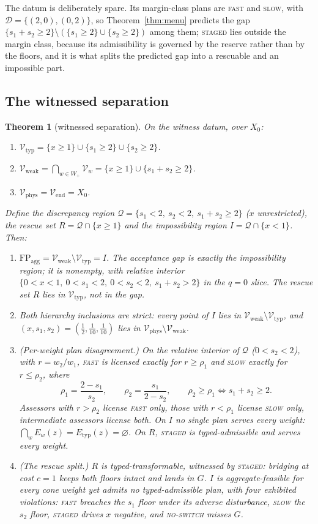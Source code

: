 \documentclass[preprint,11pt,authoryear]{elsarticle}
\newtheorem{theorem}{Theorem}
\theoremstyle{definition}
\theoremstyle{remark}
\newcommand{\Etyp}{E_{\mathrm{typ}}}
\newcommand{\Vtyp}{\mathcal{V}_{\mathrm{typ}}}
\newcommand{\Vweak}{\mathcal{V}_{\mathrm{weak}}}
\newcommand{\Vphys}{\mathcal{V}_{\mathrm{phys}}}
\newcommand{\Vend}{\mathcal{V}_{\mathrm{end}}}
\newcommand{\Wp}{W_+}
\newcommand{\FP}{\mathrm{FP}_{\mathrm{agg}}}
\newcommand{\Q}{\mathcal{Q}}
\newcommand{\act}[1]{\textsc{#1}}
\begin{document}
The datum is deliberately spare. Its margin-class plans are \act{fast} and \act{slow}, with $\mathcal D=\{(2,0),(0,2)\}$, so Theorem~\ref{thm:menu} predicts the gap $\{s_1+s_2\ge2\}\setminus(\{s_1\ge2\}\cup\{s_2\ge2\})$ among them; \act{staged} lies outside the margin class, because its admissibility is governed by the reserve rather than by the floors, and it is what splits the predicted gap into a rescuable and an impossible part.

\subsection{The witnessed separation}

\begin{theorem}[witnessed separation]\label{thm:witness}
On the witness datum, over $X_0$:
\begin{enumerate}[label=\textup{(\arabic*)},leftmargin=2em]
\item $\Vtyp=\{x\ge1\}\cup\{s_1\ge2\}\cup\{s_2\ge2\}$.
\item $\Vweak=\bigcap_{w\in\Wp}\mathcal V_w=\{x\ge1\}\cup\{s_1+s_2\ge2\}$.
\item $\Vphys=\Vend=X_0$.
\end{enumerate}
Define the \emph{discrepancy region} $\Q=\{s_1<2,\ s_2<2,\ s_1+s_2\ge2\}$ ($x$ unrestricted), the \emph{rescue set} $R=\Q\cap\{x\ge1\}$ and the \emph{impossibility region} $I=\Q\cap\{x<1\}$. Then:
\begin{enumerate}[label=\textup{(\arabic*)},leftmargin=2em,resume]
\item $\FP=\Vweak\setminus\Vtyp=I$. The acceptance gap is exactly the impossibility region; it is nonempty, with relative interior $\{0<x<1,\ 0<s_1<2,\ 0<s_2<2,\ s_1+s_2>2\}$ in the $q=0$ slice. The rescue set $R$ lies in $\Vtyp$, not in the gap.
\item Both hierarchy inclusions are strict: every point of $I$ lies in $\Vweak\setminus\Vtyp$, and $(x,s_1,s_2)=(\tfrac12,\tfrac1{10},\tfrac1{10})$ lies in $\Vphys\setminus\Vweak$.
\item \textup{(Per-weight plan disagreement.)} On the relative interior of $\Q$ ($0<s_2<2$), with $r=w_2/w_1$, \act{fast} is licensed exactly for $r\ge\rho_1$ and \act{slow} exactly for $r\le\rho_2$, where
\[
\rho_1=\frac{2-s_1}{s_2},\qquad \rho_2=\frac{s_1}{2-s_2},\qquad \rho_2\ge\rho_1\iff s_1+s_2\ge2 .
\]
Assessors with $r>\rho_2$ license \act{fast} only, those with $r<\rho_1$ license \act{slow} only, intermediate assessors license both. On $I$ no single plan serves every weight: $\bigcap_wE_w(z)=\Etyp(z)=\varnothing$. On $R$, \act{staged} is typed-admissible and serves every weight.
\item \textup{(The rescue split.)} $R$ is typed-transformable, witnessed by \act{staged}: bridging at cost $c=1$ keeps both floors intact and lands in $G$. $I$ is aggregate-feasible for every cone weight yet admits no typed-admissible plan, with four exhibited violations: \act{fast} breaches the $s_1$ floor under its adverse disturbance, \act{slow} the $s_2$ floor, \act{staged} drives $x$ negative, and \act{no-switch} misses $G$.
\end{enumerate}
\end{theorem}
\end{document}
